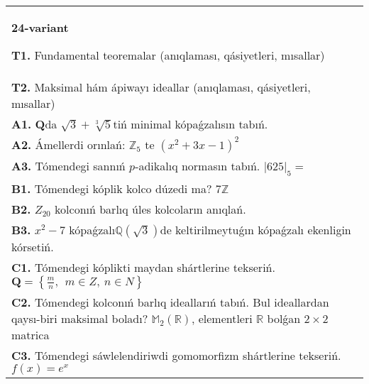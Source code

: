 \documentclass{article}
\begin{document}
\begin{tabular}{m{17cm}}
\textbf{24-variant}
\newline

\textbf{T1.} Fundamental teoremalar (anıqlaması, qásiyetleri, mısallar) \\
\textbf{T2.} Maksimal hám ápiwayı ideallar (anıqlaması, qásiyetleri, mısallar) \\
\textbf{A1.} \(\mathbf{Q}\)da \(\sqrt{3} + \sqrt[3]{5}\)tiń minimal kópaǵzalısın tabıń. \\
\textbf{A2.} Ámellerdi orınlań: \(\mathbb{Z}_{5}\) te \(\left( x^{2} + 3x - 1 \right)^{2}\) \\
\textbf{A3.} Tómendegi sannıń \(p\)-adikalıq normasın tabıń. \(|625|_{5} =\) \\
\textbf{B1.} Tómendegi kóplik kolco dúzedi ma? \(7\mathbb{Z}\) \\
\textbf{B2.} \(Z_{20}\) kolconıń barlıq úles kolcoların anıqlań. \\
\textbf{B3.} \(x^{2} - 7\) kópaǵzalı\(\mathbb{Q}(\sqrt{3})\)de keltirilmeytuǵın kópaǵzalı ekenligin kórsetiń. \\
\textbf{C1.} Tómendegi kóplikti maydan shártlerine tekseriń. \(\mathbf{Q} = \left\{ \frac{m}{n},\ \ m \in Z,\ n \in N \right\}\) \\
\textbf{C2.} Tómendegi kolconıń barlıq ideallarıń tabıń. Bul ideallardan qaysı-biri maksimal boladı? \(\mathbb{M}_{2}\left( \mathbb{R} \right)\), elementleri \(\mathbb{R}\) bolǵan \(2 \times 2\) matrica \\
\textbf{C3.} Tómendegi sáwlelendiriwdi gomomorfizm shártlerine tekseriń. \(f(x) = e^{x}\) \\

\end{tabular}
\vspace{1cm}
\end{document}
